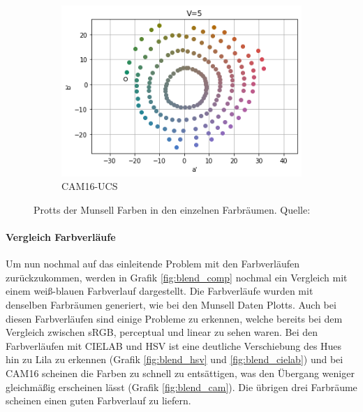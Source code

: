 \documentclass[12pt, a4paper, ngerman]{article}
\begin{document}
\begin{figure}
\begin{subfigure}[b]{0.3\linewidth}
    \includegraphics[width=\linewidth]{Grafiken/Vergleich_Munsell/cam16_munsell.png}
    \caption{CAM16-UCS}
    \label{fig:munsell_cam}
  \end{subfigure}
  
  \caption{Protts der Munsell Farben in den einzelnen Farbräumen. Quelle: ~\cite{Oklab_2020}}
  \label{fig:munsell_plots}
\end{figure}

\paragraph{Vergleich Farbverläufe}
Um nun nochmal auf das einleitende Problem mit den Farbverläufen zurückzukommen, 
werden in Grafik \ref{fig:blend_comp} nochmal ein Vergleich mit einem weiß-blauen Farbverlauf dargestellt.
Die Farbverläufe wurden mit denselben Farbräumen generiert, wie bei den Munsell Daten Plotts.
Auch bei diesen Farbverläufen sind einige Probleme zu erkennen, 
welche bereits bei dem Vergleich zwischen sRGB, perceptual und linear zu sehen waren.
Bei den Farbverläufen mit CIELAB und HSV ist eine deutliche Verschiebung des Hues hin zu Lila zu erkennen (Grafik \ref{fig:blend_hsv} und \ref{fig:blend_cielab}) und 
bei CAM16 scheinen die Farben zu schnell zu entsättigen, was den Übergang weniger gleichmäßig erscheinen lässt (Grafik \ref{fig:blend_cam}). 
Die übrigen drei Farbräume scheinen einen guten Farbverlauf zu liefern. 
\end{document}
